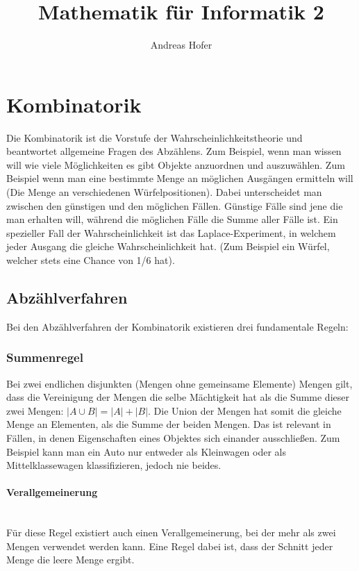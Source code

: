 \documentclass{article}
\title{\vspace{-1cm}Mathematik für Informatik 2}
\author{Andreas Hofer}
\newcommand{\paragraphlb}[1]{\paragraph{#1}\mbox{}\\}
\begin{document}
	\maketitle
	\tableofcontents
	\section{Kombinatorik}
	Die Kombinatorik ist die Vorstufe der Wahrscheinlichkeitstheorie und beantwortet allgemeine Fragen des Abzählens. Zum Beispiel, wenn man wissen will wie viele Möglichkeiten es gibt Objekte anzuordnen und auszuwählen. Zum Beispiel wenn man eine bestimmte Menge an möglichen Ausgängen ermitteln will (Die Menge an verschiedenen Würfelpositionen). Dabei unterscheidet man zwischen den günstigen und den möglichen Fällen. Günstige Fälle sind jene die man erhalten will, während die möglichen Fälle die Summe aller Fälle ist. Ein spezieller Fall der Wahrscheinlichkeit ist das Laplace-Experiment, in welchem jeder Ausgang die gleiche Wahrscheinlichkeit hat. (Zum Beispiel ein Würfel, welcher stets eine Chance von 1/6 hat).
	\subsection{Abzählverfahren}
	Bei den Abzählverfahren der Kombinatorik existieren drei fundamentale Regeln:
	\subsubsection{Summenregel}
	Bei zwei endlichen disjunkten (Mengen ohne gemeinsame Elemente) Mengen gilt, dass die Vereinigung der Mengen die selbe Mächtigkeit hat als die Summe dieser zwei Mengen: $|A \cup B|=|A|+|B|$. Die Union der Mengen hat somit die gleiche Menge an Elementen, als die Summe der beiden Mengen. Das ist relevant in Fällen, in denen Eigenschaften eines Objektes sich einander ausschließen. Zum Beispiel kann man ein Auto nur entweder als Kleinwagen oder als Mittelklassewagen klassifizieren, jedoch nie beides.
	\paragraphlb{Verallgemeinerung}
	Für diese Regel existiert auch einen Verallgemeinerung, bei der mehr als zwei Mengen verwendet werden kann. Eine Regel dabei ist, dass der Schnitt jeder Menge die leere Menge ergibt.
\end{document}
